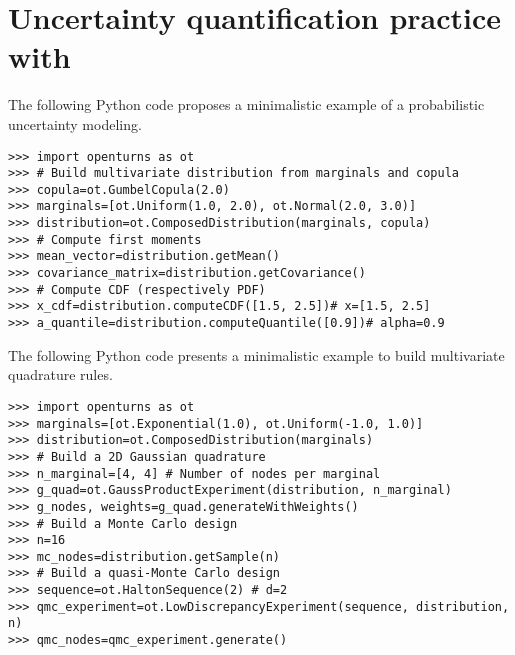 \cleardoublepage
\chapter{Uncertainty quantification practice with \ot}
\label{apx:D}




\begin{otexample}
    The following Python code proposes a minimalistic \ot example of a probabilistic uncertainty modeling. 
    \lstset{style=mystyle, language=python}
%
\begin{lstlisting}
>>> import openturns as ot
>>> # Build multivariate distribution from marginals and copula
>>> copula=ot.GumbelCopula(2.0)
>>> marginals=[ot.Uniform(1.0, 2.0), ot.Normal(2.0, 3.0)]
>>> distribution=ot.ComposedDistribution(marginals, copula)
>>> # Compute first moments
>>> mean_vector=distribution.getMean()
>>> covariance_matrix=distribution.getCovariance()
>>> # Compute CDF (respectively PDF)
>>> x_cdf=distribution.computeCDF([1.5, 2.5])# x=[1.5, 2.5]
>>> a_quantile=distribution.computeQuantile([0.9])# alpha=0.9
\end{lstlisting}
%
\end{otexample}

\begin{otexample}
    The following Python code presents a minimalistic \ot example to build multivariate quadrature rules.
%
\lstset{style=mystyle, language=python}
\begin{lstlisting}
>>> import openturns as ot
>>> marginals=[ot.Exponential(1.0), ot.Uniform(-1.0, 1.0)]
>>> distribution=ot.ComposedDistribution(marginals)
>>> # Build a 2D Gaussian quadrature
>>> n_marginal=[4, 4] # Number of nodes per marginal
>>> g_quad=ot.GaussProductExperiment(distribution, n_marginal)
>>> g_nodes, weights=g_quad.generateWithWeights()
>>> # Build a Monte Carlo design
>>> n=16 
>>> mc_nodes=distribution.getSample(n)
>>> # Build a quasi-Monte Carlo design
>>> sequence=ot.HaltonSequence(2) # d=2
>>> qmc_experiment=ot.LowDiscrepancyExperiment(sequence, distribution, n)
>>> qmc_nodes=qmc_experiment.generate()
\end{lstlisting}
%
\end{otexample}


